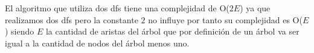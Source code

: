 El algoritmo que utiliza dos dfs tiene una complejidad de O($2E$) ya que realizamos dos dfs pero la constante $2$ no influye por tanto su complejidad es O($E$)  siendo $E$ la cantidad de aristas del árbol que por definición de un árbol va ser igual a la cantidad de nodos del árbol menos uno.